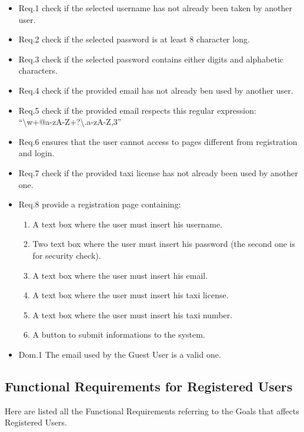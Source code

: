 \documentclass{report}
\begin{document}
				\begin{itemize}
					\item \lbrack Req.1\rbrack \label{sec:fr1_g3} check if the selected username has not already been taken by another user.
					\item \lbrack Req.2\rbrack \label{sec:fr2_g3} check if the selected password is at least 8 character long.
					\item \lbrack Req.3\rbrack \label{sec:fr3_g3} check if the selected password contains either digits and alphabetic characters.
					\item \lbrack Req.4\rbrack \label{sec:fr4_g3} check if the provided email has not already ben used by another user.
					\item \lbrack Req.5\rbrack \label{sec:fr5_g3} check if the provided email respects this regular expression:\\ \textquotedblleft\textbackslash w+@\lbrack a-zA-Z\textunderscore\rbrack +?\textbackslash .\lbrack a-zA-Z\rbrack{},3\textbraceright\textdollar\textquotedblright
					\item \lbrack Req.6\rbrack \label{sec:fr6_g3} ensures that the user cannot access to pages different from registration and login.
					\item \lbrack Req.7\rbrack \label{sec:fr7_g3} check if the provided taxi license has not already been used by another one.
					\item \lbrack Req.8\rbrack \label{sec:fr8_g3} provide a registration page containing:
						\begin{enumerate}
							\item A text box where the user must insert his username.
							\item Two text box where the user must insert his password (the second one is for security check).
							\item A text box where the user must insert his email.
							\item A text box where the user must insert his taxi license.
							\item A text box where the user must insert his taxi number.
							\item A button to submit informations to the system.
						\end{enumerate}
					\item \lbrack Dom.1\rbrack \label{sec:da1_g3} The email used by the Guest User is a valid one.
				\end{itemize}

		\subsection{Functional Requirements for Registered Users}
		Here are listed all the Functional Requirements referring to the Goals that affects Registered Users.
\end{document}
